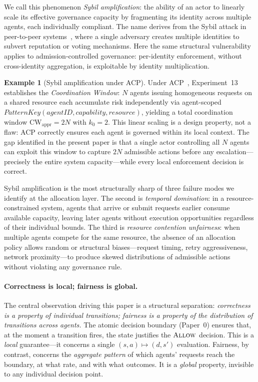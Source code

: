 \documentclass[11pt]{article}
\theoremstyle{plain}
\theoremstyle{definition}
\newtheorem{example}[theorem]{Example}
\theoremstyle{remark}
\newcommand{\Allow}{\textsc{Allow}}
\newcommand{\kbound}{k_0}                  %
\newcommand{\PatKey}{\mathit{PatternKey}}  %
\begin{document}
We call this phenomenon \emph{Sybil amplification}: the ability of an
actor to linearly scale its effective governance capacity by fragmenting
its identity across multiple agents, each individually compliant.  The
name derives from the Sybil attack in peer-to-peer
systems~\citep{douceur02}, where a single adversary creates multiple
identities to subvert reputation or voting mechanisms.  Here the
same structural vulnerability applies to admission-controlled governance:
per-identity enforcement, without cross-identity aggregation, is
exploitable by identity multiplication.

\begin{example}[Sybil amplification under ACP]
\label{ex:sybil-intro}
Under ACP~\citep{fernandez2026b}, Experiment~13 establishes the
\emph{Coordination Window}: $N$ agents issuing homogeneous requests on a
shared resource each accumulate risk independently via agent-scoped
$\PatKey(\mathit{agentID}, \mathit{capability}, \mathit{resource})$,
yielding a total coordination window $\mathrm{CW}_{\mathrm{appr}} = 2N$
with $\kbound = 2$.  This linear scaling is a design property, not a
flaw: ACP correctly ensures each agent is governed within its local
context.  The gap identified in the present paper is that a single actor
controlling all $N$ agents can exploit this window to capture $2N$
admissible actions before any escalation---precisely the entire system
capacity---while every local enforcement decision is correct.
\end{example}

Sybil amplification is the most structurally sharp of three failure modes
we identify at the allocation layer.  The second is \emph{temporal
domination}: in a resource-constrained system, agents that arrive or
submit requests earlier consume available capacity, leaving later agents
without execution opportunities regardless of their individual bounds.
The third is \emph{resource contention unfairness}: when multiple agents
compete for the same resource, the absence of an allocation policy allows
random or structural biases---request timing, retry aggressiveness,
network proximity---to produce skewed distributions of admissible actions
without violating any governance rule.

\paragraph{Correctness is local; fairness is global.}
The central observation driving this paper is a structural separation:
\emph{correctness is a property of individual transitions; fairness is a
property of the distribution of transitions across agents.}  The atomic
decision boundary (Paper~0) ensures that, at the moment a transition fires,
the state justifies the $\Allow$ decision.  This is a \emph{local}
guarantee---it concerns a single $(s, a) \mapsto (d, s')$ evaluation.
Fairness, by contrast, concerns the \emph{aggregate pattern} of which
agents' requests reach the boundary, at what rate, and with what
outcomes.  It is a \emph{global} property, invisible to any individual
decision point.
\end{document}
